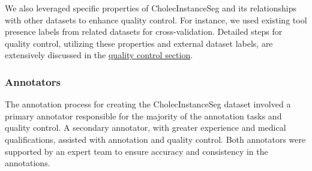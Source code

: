 \begin{enumerate}
    We also leveraged specific properties of CholecInstanceSeg and its relationships with other datasets to enhance quality control. For instance, we used existing tool presence labels from related datasets for cross-validation. Detailed steps for quality control, utilizing these properties and external dataset labels, are extensively discussed in the \hyperlink{sec:quality_control}{quality control section}.
\end{enumerate}

\subsubsection*{Annotators}
The annotation process for creating the CholecInstanceSeg dataset involved a primary annotator responsible for the majority of the annotation tasks and quality control. A secondary annotator, with greater experience and medical qualifications, assisted with annotation and quality control. Both annotators were supported by an expert team to ensure accuracy and consistency in the annotations.







